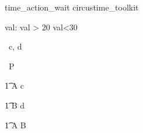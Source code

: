 \begin{zsection}
   \SECTION time\_action\_wait \parents circustime\_toolkit
\end{zsection}


\begin{axdef}
   val: \nat
\where
   val > 20 \land val<30
\end{axdef}



\begin{circus}
   \circchannel\ c, d \\
\end{circus}

\begin{circus}
    \circprocess\ P \circdef \circbegin \\
\end{circus}

\begin{circusaction}
    	\t1 A \circdef c \then \Skip \\
\end{circusaction}

\begin{circusaction}
        \t1 B \circdef d \then \Skip \\
\end{circusaction}        
      
\begin{circusaction}
     \t1 \circspot A \circseq B\\
\end{circusaction}


\begin{circus}
    \circend
\end{circus}


   